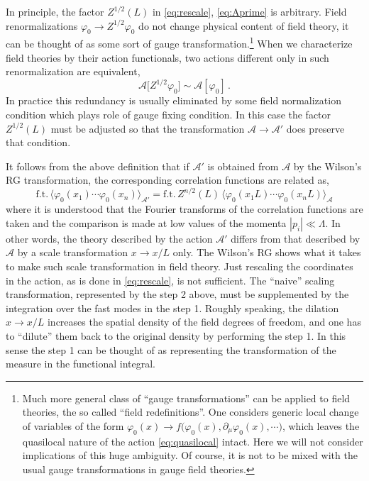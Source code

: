 In principle, the factor $Z^{1/2}(L)$ in \eqref{eq:rescale}, \eqref{eq:Aprime}
is arbitrary. Field renormalizations $\varphi_0\to Z^{1/2}\varphi_0$ do not
change physical content of field theory, it can be thought of as some sort of
gauge transformation.\footnote{Much more general class of ``gauge
transformations'' can be applied to field theories, the so called ``field
redefinitions''. One considers generic local change of variables of the form
$\varphi_0(x)\to f\bigl(\varphi_0(x),\partial_\mu\varphi_0(x),\cdots\bigr)$, which
leaves the quasilocal nature of the action \eqref{eq:quasilocal} intact. Here we
will not consider implications of this huge ambiguity. Of course, it is not to be
mixed with the usual gauge transformations in gauge field theories.} When we
characterize field theories by their action functionals, two actions different
only in such renormalization are equivalent,
\[
\mathcal A\bigl[Z^{1/2}\varphi_0\bigr]\sim\mathcal A[\varphi_0]\,.
\]
In practice this redundancy is usually eliminated by some field normalization
condition which plays role of gauge fixing condition. In this case the factor
$Z^{1/2}(L)$ must be adjusted so that the transformation
$\mathcal A\to\mathcal A'$ does preserve that condition.

It follows from the above definition that if $\mathcal A'$ is obtained from
$\mathcal A$ by the Wilson's RG transformation, the corresponding correlation
functions are related as,
\[
\text{f.t.}\,\bigl\langle\varphi_0(x_1)\cdots\varphi_0(x_n)\bigr\rangle_{\mathcal A'}
=\text{f.t.}\,Z^{n/2}(L)\,\bigl\langle\varphi_0(x_1L)\cdots\varphi_0(x_nL)\bigr\rangle_{\mathcal A}
\]
where it is understood that the Fourier transforms of the correlation functions
are taken and the comparison is made at low values of the momenta
$|p_i|\ll\Lambda$. In other words, the theory described by the action
$\mathcal A'$ differs from that described by $\mathcal A$ by a scale
transformation $x\to x/L$ only. The Wilson's RG shows what it takes to make such
scale transformation in field theory. Just rescaling the coordinates in the
action, as is done in \eqref{eq:rescale}, is not sufficient. The ``naive''
scaling transformation, represented by the step 2 above, must be supplemented by
the integration over the fast modes in the step 1. Roughly speaking, the dilation
$x\to x/L$ increases the spatial density of the field degrees of freedom, and one
has to ``dilute'' them back to the original density by performing the step 1. In
this sense the step 1 can be thought of as representing the transformation of the
measure in the functional integral.

